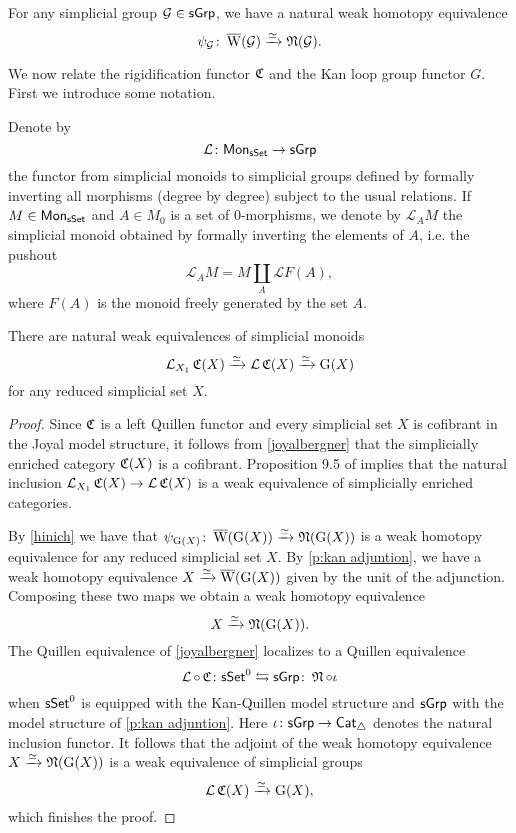 \begin{proposition} \label{hinich}
	For any simplicial group $\mathcal{G} \in \mathsf{sGrp}$, we have a natural weak homotopy equivalence
	$$\psi_{\mathcal{G}} \colon \operatorname{\overline{W}}(\mathcal{G}) \xrightarrow{\simeq} \operatorname{\mathfrak{N}}(\mathcal{G}).$$
\end{proposition} 

We now relate the rigidification functor $\operatorname{\mathfrak{C}}$ and the Kan loop group functor $G$. First we introduce some notation. 

Denote by 
\[\mathcal{L} \colon \mathsf{Mon}_{\mathsf{sSet}} \to \mathsf{sGrp} \]
the functor from simplicial monoids to simplicial groups defined by formally inverting all morphisms (degree by degree) subject to the usual relations. If $M \in \mathsf{Mon}_{\mathsf{sSet}}$ and $A \in M_0$ is a set of $0$-morphisms, we denote by $\mathcal{L}_AM$ the simplicial monoid obtained by formally inverting the elements of $A$, i.e. the pushout
\[ \mathcal{L}_AM= M \coprod_A \mathcal{L}F(A), \]
where $F(A)$ is the monoid freely generated by the set $A$. 

\begin{lemma} \label{CandG}
	There are natural weak equivalences of simplicial monoids
	\begin{equation*}
	\operatorname{\mathcal{L}}_{X_1} \operatorname{\mathfrak{C}}(X) \xrightarrow{\simeq} \operatorname{\mathcal{L}}\operatorname{\mathfrak{C}}(X) \xrightarrow{\simeq} \operatorname{G}(X)
	\end{equation*}
	for any reduced simplicial set $X$.
\end{lemma}

\begin{proof}
	Since $\operatorname{\mathfrak{C}}$ is a left Quillen functor and every simplicial set $X$ is cofibrant in the Joyal model structure, it follows from \cref{joyalbergner} that the simplicially enriched category $\operatorname{\mathfrak{C}}(X)$ is a cofibrant.
	Proposition 9.5 of \cite{dwyer1980simplicial} implies that the natural inclusion $\operatorname{\mathcal{L}}_{X_1} \operatorname{\mathfrak{C}}(X) \to \operatorname{\mathcal{L}}\operatorname{\mathfrak{C}}(X)$ is a weak equivalence of simplicially enriched categories.
	
	By \cref{hinich} we have that $\psi_{\operatorname{G}(X)} \colon \operatorname{\overline{W}}(\operatorname{G}(X)) \xrightarrow{\simeq} \operatorname{\mathfrak{N}}(\operatorname{G}(X))$ is a weak homotopy equivalence for any reduced simplicial set $X$.
	By \cref{p:kan adjuntion}, we have a weak homotopy equivalence $X \xrightarrow{\simeq} \operatorname{\overline{W}}(\operatorname{G}(X))$ given by the unit of the adjunction.
	Composing these two maps we obtain a weak homotopy equivalence
	$$X \xrightarrow{\simeq} \operatorname{\mathfrak{N}}(\operatorname{G}(X)).$$
	The Quillen equivalence of \cref{joyalbergner} localizes to a Quillen equivalence
	$$\operatorname{\mathcal{L}} \circ \operatorname{\mathfrak{C}} \colon \mathsf{sSet}^0 \leftrightarrows \mathsf{sGrp} \colon \operatorname{\mathfrak{N}} \circ \iota$$
	when $\mathsf{sSet}^0$ is equipped with the Kan-Quillen model structure and $\mathsf{sGrp}$ with the model structure of \cref{p:kan adjuntion}.
	Here $\iota \colon \mathsf{sGrp} \to \mathsf{Cat}_{\triangle}$ denotes the natural inclusion functor.
	It follows that the adjoint of the weak homotopy equivalence $X \xrightarrow{\simeq} \operatorname{\mathfrak{N}}(\operatorname{G}(X))$ is a weak equivalence of simplicial groups
	$$\operatorname{\mathcal{L}}\operatorname{\mathfrak{C}}(X) \xrightarrow{\simeq} \operatorname{G}(X),$$
	which finishes the proof.
\end{proof}


